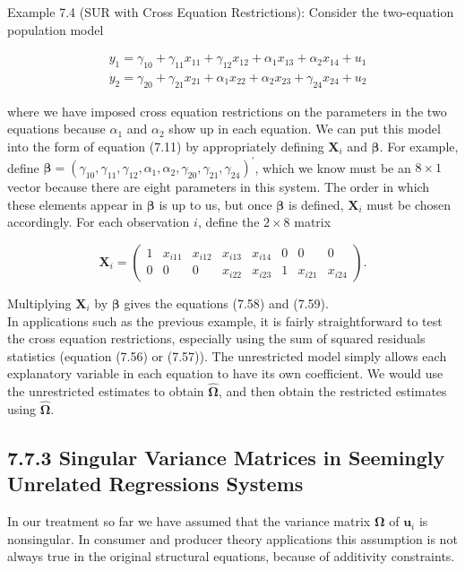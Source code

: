 \documentclass[10pt]{article}
\begin{document}
Example 7.4 (SUR with Cross Equation Restrictions): Consider the two-equation population model


\begin{align*}
& y_{1}=\gamma_{10}+\gamma_{11} x_{11}+\gamma_{12} x_{12}+\alpha_{1} x_{13}+\alpha_{2} x_{14}+u_{1}  \tag{7.58}\\
& y_{2}=\gamma_{20}+\gamma_{21} x_{21}+\alpha_{1} x_{22}+\alpha_{2} x_{23}+\gamma_{24} x_{24}+u_{2} \tag{7.59}
\end{align*}


where we have imposed cross equation restrictions on the parameters in the two equations because $\alpha_{1}$ and $\alpha_{2}$ show up in each equation. We can put this model into the form of equation (7.11) by appropriately defining $\mathbf{X}_{i}$ and $\boldsymbol{\beta}$. For example, define $\boldsymbol{\beta}=\left(\gamma_{10}, \gamma_{11}, \gamma_{12}, \alpha_{1}, \alpha_{2}, \gamma_{20}, \gamma_{21}, \gamma_{24}\right)^{\prime}$, which we know must be an $8 \times 1$ vector because there are eight parameters in this system. The order in which these elements appear in $\boldsymbol{\beta}$ is up to us, but once $\boldsymbol{\beta}$ is defined, $\mathbf{X}_{i}$ must be chosen accordingly. For each observation $i$, define the $2 \times 8$ matrix

$$
\mathbf{X}_{i}=\left(\begin{array}{cccccccc}
1 & x_{i 11} & x_{i 12} & x_{i 13} & x_{i 14} & 0 & 0 & 0 \\
0 & 0 & 0 & x_{i 22} & x_{i 23} & 1 & x_{i 21} & x_{i 24}
\end{array}\right) .
$$

Multiplying $\mathbf{X}_{i}$ by $\boldsymbol{\beta}$ gives the equations (7.58) and (7.59).\\
In applications such as the previous example, it is fairly straightforward to test the cross equation restrictions, especially using the sum of squared residuals statistics (equation (7.56) or (7.57)). The unrestricted model simply allows each explanatory variable in each equation to have its own coefficient. We would use the unrestricted estimates to obtain $\hat{\boldsymbol{\Omega}}$, and then obtain the restricted estimates using $\hat{\boldsymbol{\Omega}}$.

\subsection*{7.7.3 Singular Variance Matrices in Seemingly Unrelated Regressions Systems}
In our treatment so far we have assumed that the variance matrix $\boldsymbol{\Omega}$ of $\mathbf{u}_{i}$ is nonsingular. In consumer and producer theory applications this assumption is not always true in the original structural equations, because of additivity constraints.
\end{document}
